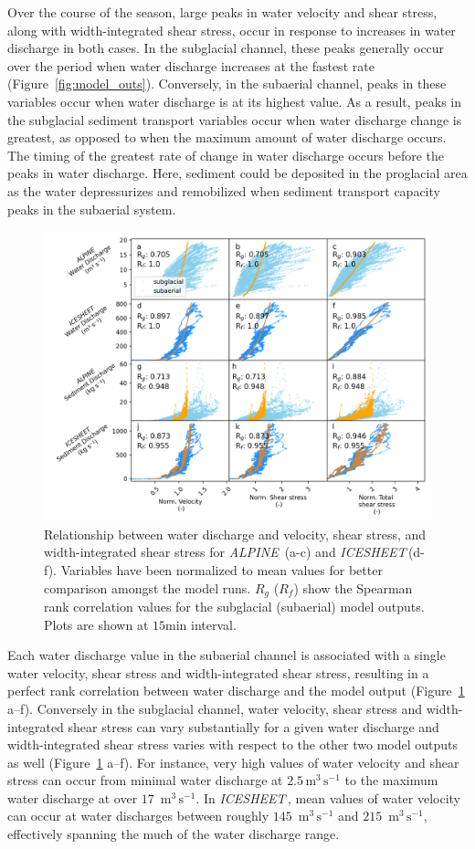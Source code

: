 \documentclass[11pt]{article}
\newcommand{\alpine}{\textit{ALPINE}\,}
\newcommand{\icesheet}{\textit{ICESHEET}\,}
\newcommand{\unit}[1]{$\mathrm{#1}$}
\begin{document}
Over the course of the season, large peaks in water velocity and shear stress, along with width-integrated shear stress, occur in response to increases in water discharge in both cases.
In the subglacial channel, these peaks generally occur over the period when water discharge increases at the fastest rate (Figure~\ref{fig:model_outs}).
Conversely, in the subaerial channel, peaks in these variables occur when water discharge is at its highest value.
As a result, peaks in the subglacial sediment transport variables occur  when water discharge change is greatest, as opposed to when the maximum amount of water discharge occurs.
The timing of the greatest rate of change in water discharge occurs before the peaks in water discharge. 
Here, sediment could be deposited in the proglacial area as the water depressurizes and remobilized when sediment transport capacity peaks in the subaerial system.

\begin{figure}[h]
  \centering
  \includegraphics[width=0.8\linewidth]{Fig3.png}
  \caption{Relationship between water discharge and velocity, shear stress, and width-integrated shear stress for \alpine{}  (a-c) and \icesheet (d-f). Variables have been normalized to mean values for better comparison amongst the model runs.
    $R_g$ ($R_f$) show the Spearman rank correlation values for the subglacial (subaerial) model outputs.
    Plots are shown at $15$\unit{min} interval.} 
  \label{fig:Qw_vari}
\end{figure}

Each water discharge value in the subaerial channel is associated with a single water velocity, shear stress and width-integrated shear stress, resulting in a perfect rank correlation between water discharge and the model output (Figure~\ref{fig:Qw_vari} a--f).
Conversely in the subglacial channel,  water velocity, shear stress and width-integrated shear stress can vary substantially for a given water discharge and width-integrated shear stress varies with respect to the other two model outputs as well (Figure~\ref{fig:Qw_vari} a--f).
For instance, very high values of water velocity and shear stress can occur from minimal water discharge at $2.5$\,\unit{m}$^3$\,\unit{s}$^{-1}$ to the maximum water discharge at over $17$ \,\unit{m}$^3$\,\unit{s}$^{-1}$.
In \icesheet, mean values of water velocity can occur at water discharges between roughly $145$ \,\unit{m}$^3$\,\unit{s}$^{-1}$ and $215$ \,\unit{m}$^3$\,\unit{s}$^{-1}$, effectively spanning the much of the water discharge range.
\end{document}
